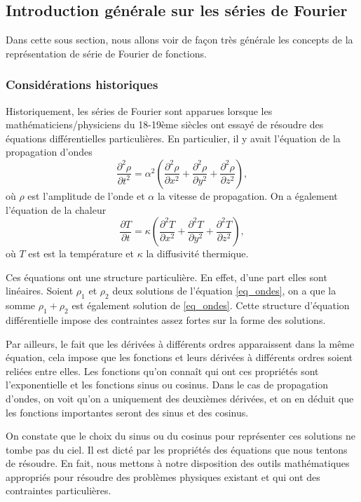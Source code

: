 \documentclass[a4paper,12pt]{book}
\newcommand{\pDeriv}[2]{\frac{\partial #1}{\partial #2}}
\newcommand{\pDerivTwo}[2]{\frac{\partial^2 #1}{\partial #2^2}}
\begin{document}
\subsection{Introduction générale sur les séries de Fourier}

Dans cette sous section, nous allons voir de façon très générale les concepts 
de la représentation de série de Fourier de fonctions.

\subsubsection{Considérations historiques}

Historiquement, les séries de Fourier sont apparues lorsque les mathématiciens/physiciens 
du 18-19ème siècles ont essayé de résoudre des équations différentielles particulières. 
En particulier, il y avait l'équation de la propagation d'ondes
\begin{equation}
 \pDerivTwo{\rho}{t}=\alpha^2\left(\pDerivTwo{\rho}{x}+\pDerivTwo{\rho}{y}+\pDerivTwo{\rho}{z}\right),\label{eq_ondes}
\end{equation}
où $\rho$ est l'amplitude de l'onde et $\alpha$ la vitesse de propagation.
On a également l'équation de la chaleur 
\begin{equation}
 \pDeriv{T}{t}=\kappa\left(\pDerivTwo{T}{x}+\pDerivTwo{T}{y}+\pDerivTwo{T}{z}\right),
\end{equation}
où $T$ est est la température et $\kappa$ la diffusivité thermique.

Ces équations ont une structure particulière. En effet, d'une part elles sont linéaires. Soient $\rho_1$ et $\rho_2$
deux solutions de l'équation \eqref{eq_ondes}, on a que la somme $\rho_1+\rho_2$ est également solution de \eqref{eq_ondes}.
Cette structure d'équation différentielle impose des contraintes assez fortes sur la forme des solutions.

Par ailleurs, le fait que les dérivées à différents ordres apparaissent dans la même équation, cela impose 
que les fonctions et leurs dérivées à différents ordres soient reliées entre elles. Les fonctions qu'on connaît
qui ont ces propriétés sont l'exponentielle et les fonctions sinus ou cosinus.
Dans le cas de propagation d'ondes, on voit qu'on a uniquement des deuxièmes dérivées, et on en déduit
que les fonctions importantes seront des sinus et des cosinus.

On constate que le choix du sinus ou du cosinus pour représenter ces solutions ne tombe pas du ciel.
Il est dicté par les propriétés des équations que nous tentons de résoudre. En fait, nous mettons à 
notre disposition des outils mathématiques appropriés pour résoudre des problèmes physiques
existant et qui ont des contraintes particulières.
\end{document}
